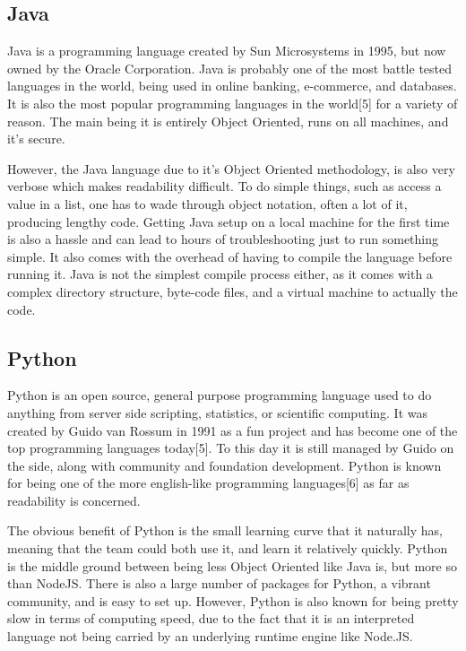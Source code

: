 \documentclass[onecolumn, draftclsnofoot,10pt, compsoc]{IEEEtran}
\begin{document}
    \subsection{Java}
        Java is a programming language created by Sun Microsystems in 1995, but now owned by the Oracle Corporation. Java is probably one of the most battle tested languages in the world, being used in online banking, e-commerce, and databases. It is also the most popular programming languages in the world[5] for a variety of reason. The main being it is entirely Object Oriented, runs on all machines, and it’s secure. 

        However, the Java language due to it’s Object Oriented methodology, is also very verbose which makes readability difficult. To do simple things, such as access a value in a list, one has to wade through object notation, often a lot of it, producing lengthy code. Getting Java setup on a local machine for the first time is also a hassle and can lead to hours of troubleshooting just to run something simple. It also comes with the overhead of having to compile the language before running it. Java is not the simplest compile process either, as it comes with a complex directory structure, byte-code files, and a virtual machine to actually the code.  
 
    \subsection{Python}
       Python is an open source, general purpose programming language used to do anything from server side scripting, statistics, or scientific computing. It was created by Guido van Rossum in 1991 as a fun project and has become one of the top programming languages today[5]. To this day it is still managed by Guido on the side, along with community and foundation development. Python is known for being one of the more english-like programming languages[6] as far as readability is concerned. 

    
        The obvious benefit of Python is the small learning curve that it naturally has, meaning that the team could both use it, and learn it relatively quickly. Python is the middle ground between being less Object Oriented like Java is, but more so than NodeJS. There is also a large number of packages for Python, a vibrant community, and is easy to set up.  However, Python is also known for being pretty slow in terms of computing speed, due to the fact that it is an interpreted language not being carried by an underlying runtime engine like Node.JS.
 
\end{document}
